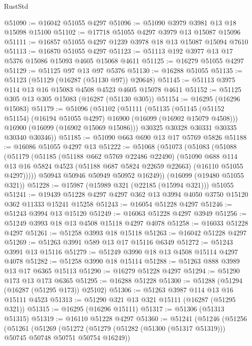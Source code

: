 \begin{lexlean}{RustStd}
\begin{coremodule}
@51090 := @16042 @51055 @4297
@51096 := @51090 @3979 @3981 @13 @18 @15098 @15100
@51102 := @17718 @51055 @4297 @3979 @13 @15087 @15096
@51111 := @16857 @51055 @4297 @1239 @3978 @18 @13 @15087 @15094 @7610
@51113 := @16870 @51055 @4297
@51123 := @51113 @192 @3977 @13 @17 @5376 @15086 @15093 @4605 @15068 @4611
@51125 := @16279 @51055 @4297
@51129 := @51125 @97 @13 @97 @5376
@51130 := @16288 @51055
@51135 := @51123 (@51129 (@16287 (@51130 @97)) @20648)
@51145 := @51113 @3975 @114 @13 @16 @15083 @4508 @4523 @4605 @15078 @4611
@51152 := @51125 @305 @13 @305 @15083 (@16287 (@51130 @305))
@51154 := @16295 (@16296 @15083)
@51179 := @51096
    (@51102
      (@51111
        (@51135
          (@51145 (@51152 @51154) (@16194 @51055 @4297) @16900 (@16099 (@16902 @15079 @4508)))
          @16900
          (@16099 (@16902 @15069 @15086)))
        @30325
        @30328
        @30331
        @30335
        @30340
        @30346))
@51185 := @51090 @663 @690 @13 @17 @5769 @5826
@51188 := @16086 @51055 @4297 @13
@51222 := @51068
    (@51073
      (@51083
        (@51088
          (@51179
            (@51185
              (@51188 @662 @5769 @22486 @22490)
              (@51090
                @688
                @114
                @13
                @16
                @5824
                @4523
                (@51188 @687 @5824 @22659 @22663)
                (@16110 @51055 @4297)))))
        @50943
        @50946
        @50949
        @50952
        @16249))
    (@16099 (@19480 @51055 @321))
@51228 := @15987 (@15989 @321 (@22185 (@15994 @321))) @51055
@51241 := @19439 @51228 @4297 @4297 @362 @13 @3994 @4050 @3750 @15120 @362 @11333 @15241 @15258
@51243 := @16054 @51228 @4297
@51246 := @51243 @3994 @13 @15120
@51249 := @16063 @51228 @4297 @3949
@51256 := @51249 @3993 @18 @13 @4508 @15118 @4297 @4078
@51258 := @16033 @51228 @4297
@51261 := @51258 @3993 @18 @15118
@51263 := @16042 @51228 @4297
@51269 := @51263 @3991 @589 @13 @17 @15116 @6349
@51272 := @51243 @3991 @13 @15116
@51279 := @51249 @3990 @18 @13 @4508 @15114 @4297 @4078
@51282 := @51258 @3990 @18 @15114
@51288 := @51263 @888 @3989 @13 @17 @6365 @15113
@51290 := @16279 @51228 @4297
@51294 := @51290 @173 @13 @173 @6365
@51295 := @16288 @51228
@51300 := @51288 (@51294 (@16287 (@51295 @173)) @25102)
@51306 := @51263 @3987 @114 @13 @16 @15111 @4523
@51313 := @51290 @321 @13 @321 @15111 (@16287 (@51295 @321))
@51315 := @16295 (@16296 @15111)
@51317 := @51306 (@51313 @51315)
@51319 := @16110 @51228 @4297
@51360 := @51241
    (@51246
      (@51256
        (@51261
          (@51269
            (@51272 (@51279 (@51282 (@51300 (@51317 @51319))) @50745 @50748 @50751 @50754 @16249))

\end{coremodule}
\end{lexlean}
